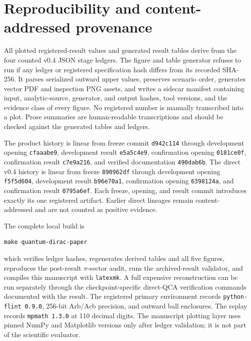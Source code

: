 \section{Reproducibility and content-addressed provenance}
\label{sec:reproducibility}

All plotted registered-result values and generated result tables derive from
the four counted v0.4 JSON stage ledgers.  The figure and table generator refuses to run if
any ledger or registered specification hash differs from its recorded SHA-256.
It parses serialized outward upper values, preserves scenario order, generates
vector PDF and inspection PNG assets, and writes a sidecar manifest containing
input, analytic-source, generator, and output hashes, tool versions, and the
evidence class of every figure.  No registered number is manually transcribed
into a plot.  Prose summaries are human-readable transcriptions and should be
checked against the generated tables and ledgers.

The product history is linear from freeze commit \texttt{d942c114} through
development opening \texttt{cfaaabe9}, development result
\texttt{e5a5c4e9}, confirmation opening \texttt{0181ce0f}, confirmation result
\texttt{c7e9a216}, and verified documentation \texttt{490dab6b}.  The direct
v0.4 history is linear from freeze \texttt{890962df} through development
opening \texttt{f5f5d604}, development result \texttt{b96e70a1}, confirmation
opening \texttt{6398124a}, and confirmation result \texttt{0795a6ef}.  Each
freeze, opening, and result commit introduces exactly its one registered
artifact.  Earlier direct lineages remain content-addressed and are not counted
as positive evidence.

The complete local build is
\begin{verbatim}
make quantum-dirac-paper
\end{verbatim}
which verifies ledger hashes, regenerates derived tables and all five figures,
reproduces the post-result $\pi$-sector audit, runs the archived-result
validator, and compiles this manuscript with \texttt{latexmk}.  A full
expensive reconstruction can be run separately through the
checkpoint-specific direct-QCA verification commands documented with the
result.  The
registered primary environment records \texttt{python-flint 0.9.0}, 256-bit
Arb/Acb precision, and outward ball enclosures.  The replay records
\texttt{mpmath 1.3.0} at 110 decimal digits.  The manuscript plotting layer
uses pinned NumPy and Matplotlib versions only after ledger validation; it is
not part of the scientific evaluator.

